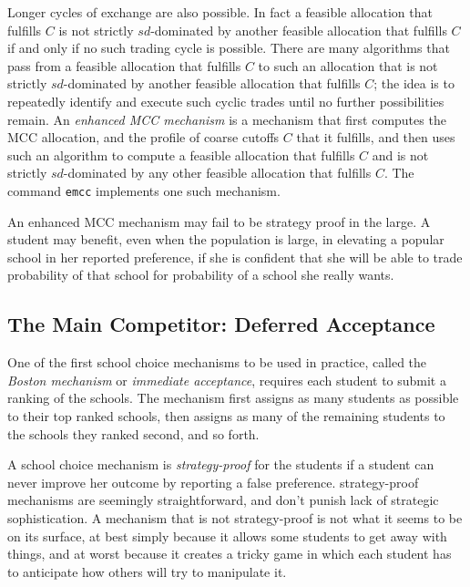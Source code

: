 \documentclass[12pt]{article}
\theoremstyle{definition}
\begin{document}
Longer cycles of exchange are also possible.  In fact a feasible
allocation that fulfills $C$ is not strictly $sd$-dominated by another
feasible allocation that fulfills $C$ if and only if no such trading
cycle is possible.  There are many algorithms that pass from a
feasible allocation that fulfills $C$ to such an allocation that is
not strictly $sd$-dominated by another feasible allocation that
fulfills $C$; the idea is to repeatedly identify and execute such
cyclic trades until no further possibilities remain.  An
\emph{enhanced MCC mechanism} is a mechanism that first computes the
MCC allocation, and the profile of coarse cutoffs $C$ that it
fulfills, and then uses such an algorithm to compute a feasible
allocation that fulfills $C$ and is not strictly $sd$-dominated by any
other feasible allocation that fulfills $C$.  The command
\texttt{emcc} implements one such mechanism.

An enhanced MCC mechanism may fail to be strategy proof in the large.
A student may benefit, even when the population is large, in elevating
a popular school in her reported preference, if she is confident that
she will be able to trade probability of that school for probability
of a school she really wants.

\subsection{The Main Competitor: Deferred Acceptance}

One of the first school choice mechanisms to be used in practice,
called the \emph{Boston mechanism} or \emph{immediate acceptance},
requires each student to submit a ranking of the schools.  The
mechanism first assigns as many students as possible to their top
ranked schools, then assigns as many of the remaining students to the
schools they ranked second, and so forth.

A school choice mechanism is \emph{strategy-proof} for the students if
a student can never improve her outcome by reporting a false
preference.  strategy-proof mechanisms are seemingly straightforward,
and don't punish lack of strategic sophistication.  A mechanism that
is not strategy-proof is not what it seems to be on its surface, at
best simply because it allows some students to get away with things,
and at worst because it creates a tricky game in which each student
has to anticipate how others will try to manipulate it.
\end{document}
